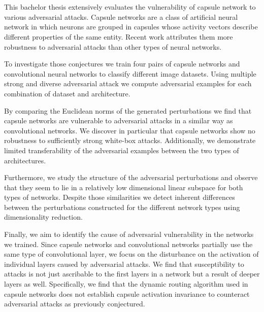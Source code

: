 \section*{}

This bachelor thesis extensively evaluates the vulnerability of capsule network to various adversarial attacks.
Capsule networks are a class of artificial neural network in which neurons are grouped in capsules whose activity vectors describe different properties of the same entity.
Recent work attributes them more robustness to adversarial attacks than other types of neural networks.

To investigate those conjectures we train four pairs of capsule networks and convolutional neural networks to classify different image datasets.
Using multiple strong and diverse adversarial attack we compute adversarial examples for each combination of dataset and architecture.

By comparing the Euclidean norms of the generated perturbations we find that capsule networks are vulnerable to adversarial attacks in a similar way as convolutional networks.
We discover in particular that capsule networks show no robustness to sufficiently strong white-box attacks.
Additionally, we demonstrate limited transferability of the adversarial examples between the two types of architectures.

Furthermore, we study the structure of the adversarial perturbations and observe that they seem to lie in a relatively low dimensional linear subspace for both types of networks.
Despite those similarities we detect inherent differences between the perturbations constructed for the different network types using dimensionality reduction.

Finally, we aim to identify the cause of adversarial vulnerability in the networks we trained.
Since capsule networks and convolutional networks partially use the same type of convolutional layer, we focus on the disturbance on the activation of individual layers caused by adversarial attacks.
We find that susceptibility to attacks is not just ascribable to the first layers in a network but a result of deeper layers as well.
Specifically, we find that the dynamic routing algorithm used in capsule networks does not establish capsule activation invariance to counteract adversarial attacks as previously conjectured.
